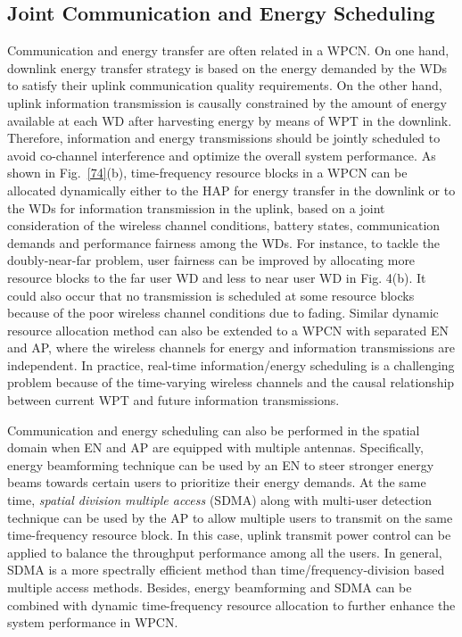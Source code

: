 \documentclass[journal, draftcls, one column, 12pt]{IEEEtran}
\begin{document}
\subsection{Joint Communication and Energy Scheduling}
Communication and energy transfer are often related in a WPCN. On one hand, downlink energy transfer strategy is based on the energy demanded by the WDs to satisfy their uplink communication quality requirements. On the other hand, uplink information transmission is causally constrained by the amount of energy available at each WD after harvesting energy by means of WPT in the downlink. Therefore, information and energy transmissions should be jointly scheduled to avoid co-channel interference and optimize the overall system performance. As shown in Fig.~\ref{74}(b), time-frequency resource blocks in a WPCN can be allocated dynamically either to the HAP for energy transfer in the downlink or to the WDs for information transmission in the uplink, based on a joint consideration of the wireless channel conditions, battery states, communication demands and performance fairness among the WDs. For instance, to tackle the doubly-near-far problem, user fairness can be improved by allocating more resource blocks to the far user WD and less to near user WD in Fig. 4(b). It could also occur that no transmission is scheduled at some resource blocks because of the poor wireless channel conditions due to fading. Similar dynamic resource allocation method can also be extended to a WPCN with separated EN and AP, where the wireless channels for energy and information transmissions are independent. In practice, real-time information/energy scheduling is a challenging problem because of the time-varying wireless channels and the causal relationship between current WPT and future information transmissions.

Communication and energy scheduling can also be performed in the spatial domain when EN and AP are equipped with multiple antennas\cite{2014:Liu}. Specifically, energy beamforming technique can be used by an EN to steer stronger energy beams towards certain users to prioritize their energy demands. At the same time, \emph{spatial division multiple access} (SDMA) along with multi-user detection technique can be used by the AP to allow multiple users to transmit on the same time-frequency resource block. In this case, uplink transmit power control can be applied to balance the throughput performance among all the users. In general, SDMA is a more spectrally efficient method than time/frequency-division based multiple access methods. Besides, energy beamforming and SDMA can be combined with dynamic time-frequency resource allocation to further enhance the system performance in WPCN.
\end{document}
